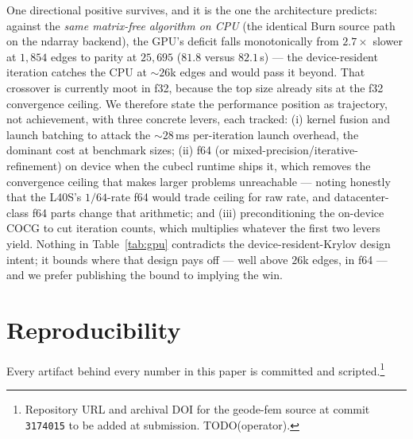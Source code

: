 \documentclass{anvil-paper}
\begin{document}
One directional positive survives, and it is the one the architecture
predicts: against the \emph{same matrix-free algorithm on CPU} (the
identical Burn source path on the ndarray backend), the GPU's deficit
falls monotonically from $2.7\times$ slower at $1{,}854$ edges to parity
at $25{,}695$ ($81.8$ versus $82.1$\,s) --- the device-resident iteration
catches the CPU at ${\sim}26$k edges and would pass it beyond. That
crossover is currently moot in f32, because the top size already sits at
the f32 convergence ceiling. We therefore state the performance position
as trajectory, not achievement, with three concrete levers, each tracked:
(i) kernel fusion and launch batching to attack the ${\sim}28$\,ms
per-iteration launch overhead, the dominant cost at benchmark sizes;
(ii) f64 (or mixed-precision/iterative-refinement) on device when the
cubecl runtime ships it, which removes the convergence ceiling that makes
larger problems unreachable --- noting honestly that the L40S's
$1/64$-rate f64 would trade ceiling for raw rate, and datacenter-class
f64 parts change that arithmetic; and (iii) preconditioning the on-device
COCG to cut iteration counts, which multiplies whatever the first two
levers yield. Nothing in Table~\ref{tab:gpu} contradicts the
device-resident-Krylov design intent; it bounds where that design pays
off --- well above $26$k edges, in f64 --- and we prefer publishing the
bound to implying the win.


\section{Reproducibility}
\label{sec:repro}

Every artifact behind every number in this paper is committed and
scripted.\footnote{Repository URL and archival DOI for the geode-fem
source at commit \texttt{3174015} to be added at submission.
TODO(operator).}
\end{document}

